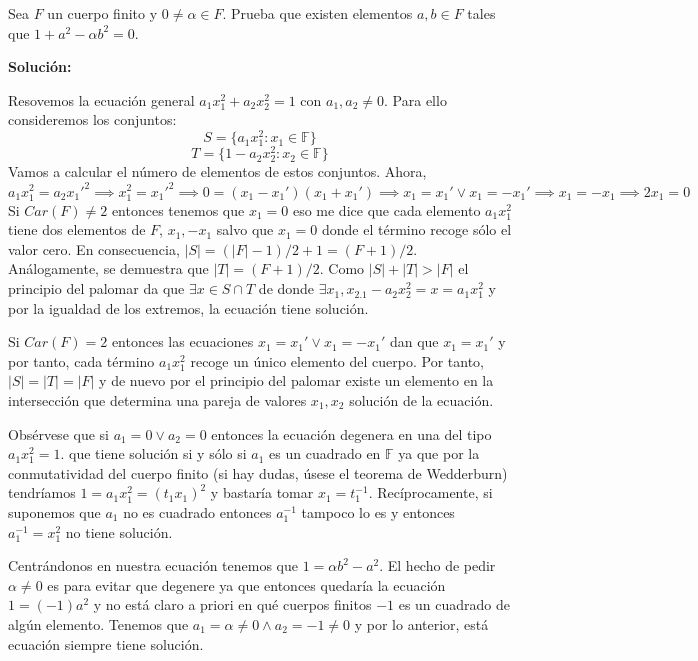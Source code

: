 \begin{exercise}
Sea $F$ un cuerpo finito y $0 \neq \alpha \in F$. Prueba que existen elementos $a,b \in F$ tales que $1+a^2 - \alpha b^2 = 0$. 
\end{exercise}

\textbf{Solución:}

Resovemos la ecuación general $a_1 x_1^2 + a_2 x_2^2 = 1$ con $a_1,a_2 \neq 0$. Para ello consideremos los conjuntos: $$S = \{a_1x_1^2:x_1 \in \mathbb{F} \}$$ $$T = \{1-a_2 x_2^2:x_2 \in \mathbb{F} \}$$ Vamos a calcular el número de elementos de estos conjuntos. Ahora, $$a_1 x_1^2 = a_2 x_1'^2 \implies x_1^2 = x_1'^2 \implies 0 = (x_1 - x_1')(x_1+x_1') \implies x_1 = x_1' \lor x_1 = -x_1' \implies x_1 = -x_1 \implies 2x_1 = 0$$ Si $Car(F) \neq 2$ entonces tenemos que $x_1 = 0$ eso me dice que cada elemento $a_1x_1^2$ tiene dos elementos de $F$, $x_1,-x_1$ salvo que $x_1 = 0$ donde el término recoge sólo el valor cero. En consecuencia, $|S| = (|F|-1)/2 + 1 = (F+1)/2$. Análogamente, se demuestra que $|T| = (F+1)/2$. Como $|S|+|T| > |F|$ el principio del palomar da que $\exists x \in S \cap T$ de donde $\exists x_1,x_2.1-a_2 x_2^2 = x = a_1 x_1^2$ y por la igualdad de los extremos, la ecuación tiene solución. 

Si $Car(F) = 2$ entonces las ecuaciones $x_1 = x_1' \lor x_1 = -x_1'$ dan que $x_1 = x_1'$ y por tanto, cada término $a_1x_1^2$ recoge un único elemento del cuerpo. Por tanto, $|S| = |T| = |F|$ y de nuevo por el principio del palomar existe un elemento en la intersección que determina una pareja de valores $x_1,x_2$ solución de la ecuación. 

Obsérvese que si $a_1 = 0 \lor a_2 = 0$ entonces la ecuación degenera en una del tipo $a_1 x_1^2 = 1$.  que tiene solución si y sólo si $a_1$ es un cuadrado en $\mathbb{F}$ ya que por la conmutatividad del cuerpo finito (si hay dudas, úsese el teorema de Wedderburn) tendríamos $1 = a_1x_1^2 = (t_1x_1)^2$ y bastaría tomar $x_1 = t_1^{-1}$. Recíprocamente, si suponemos que $a_1$ no es cuadrado entonces $a_1^{-1}$ tampoco lo es y entonces $a_1^{-1} = x_1^2$ no tiene solución. 

Centrándonos en nuestra ecuación tenemos que $1 = \alpha b^2  - a^2$. El hecho de pedir $\alpha \neq 0$ es para evitar que degenere ya que entonces quedaría la ecuación $1 = (-1)a^2$ y no está claro a priori en qué cuerpos finitos $-1$ es un cuadrado de algún elemento. Tenemos que $a_1 = \alpha \neq 0 \land a_2 = -1 \neq 0$ y por lo anterior, está ecuación siempre tiene solución.